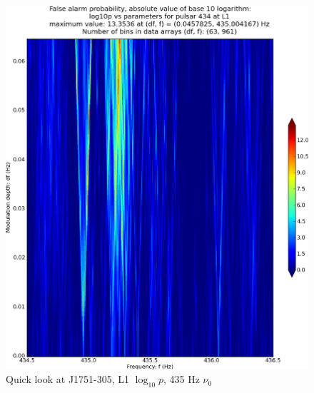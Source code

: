 \begin{figure}
\begin{center}
\includegraphics[width=0.5\paperwidth,height=0.35\paperheight]{plots/DFvsFresultsProb-L1_pulsar-434.eps}
\caption{
Quick look at J1751-305, L1 $\log_{10}p$, 435 Hz $\nu_0$}
\end{center}
\end{figure}



